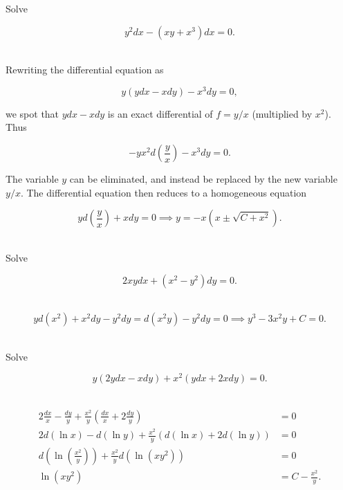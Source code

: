 \documentclass[english,a4paper,12pt]{report}
\begin{document}
{Solve 

\begin{equation}
    y^2dx-(xy+x^3 )dx = 0.
\end{equation}~
}
{Rewriting the differential equation as 

\begin{equation}
    y(ydx-xdy) - x^3 dy = 0,
\end{equation}

we spot that \(ydx - xdy\) is an exact differential of \(f = y /x \) (multiplied by \(x^2\)). Thus

\begin{equation}
    -yx^2 d\left( \frac{y}{x}  \right) - x^3 dy= 0.
\end{equation}

The variable \(y\) can be eliminated, and instead be replaced by the new variable \(y /x\). The differential equation then reduces to a homogeneous equation

\begin{equation}
    y d \left( \frac{y}{x}  \right) + xdy = 0 \implies     y = -x(x\pm \sqrt{C+x^2} ).
\end{equation}~
} 


{Solve 

\begin{equation}
    2xydx+(x^2-y^2)dy = 0.
\end{equation}~
}
{\begin{equation}
    yd(x^2)+x^2dy-y^2dy = d(x^2y)-y^2dy = 0 \implies y^3 - 3x^2y +C = 0.
\end{equation}~
} 


{Solve 

\begin{equation}
    y (2ydx-xdy) + x^2(ydx+2xdy) = 0.
\end{equation}~
}
{\begin{equation}
    \begin{aligned} 
    2 \frac{dx}{x} - \frac{dy}{y} + \frac{x^2}{y}\left( \frac{dx}{x} + 2 \frac{dy}{y}   \right) &= 0 \\
    2d(\ln x) - d(\ln y) + \frac{x^2}{y}(d(\ln x)+2d(\ln y)) &=0 \\
    d\left( \ln (\frac{x^2}{y} ) \right) + \frac{x^2}{y}d(\ln (xy^2)) &= 0 \\ 
    \ln (xy^2) &= C - \frac{x^2}{y}. 
    \end{aligned} 
\end{equation}~
} 
\end{document}
